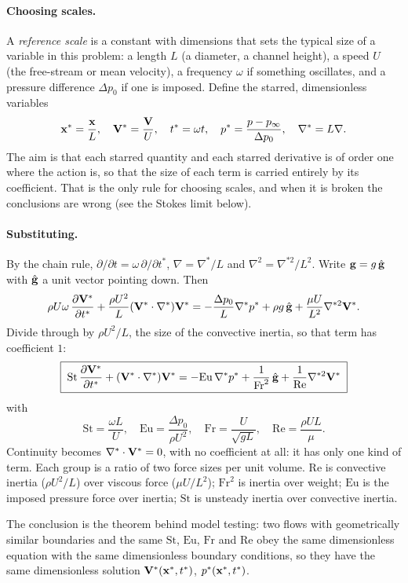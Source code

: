\paragraph{Choosing scales.} A \emph{reference scale} is a constant with dimensions that sets the typical size of a variable in this problem: a length $L$ (a diameter, a channel height), a speed $U$ (the free-stream or mean velocity), a frequency $\omega$ if something oscillates, and a pressure difference $\Delta p_0$ if one is imposed. Define the starred, dimensionless variables
\[
\mathbf{x}^* = \frac{\mathbf{x}}{L}, \quad \mathbf{V}^* = \frac{\mathbf{V}}{U}, \quad t^* = \omega t, \quad p^* = \frac{p - p_\infty}{\Delta p_0}, \quad \nabla^* = L\nabla .
\]
The aim is that each starred quantity and each starred derivative is of order one where the action is, so that the size of each term is carried entirely by its coefficient. That is the only rule for choosing scales, and when it is broken the conclusions are wrong (see the Stokes limit below).

\paragraph{Substituting.} By the chain rule, $\partial/\partial t = \omega\,\partial/\partial t^*$, $\nabla = \nabla^*/L$ and $\nabla^2 = \nabla^{*2}/L^2$. Write $\mathbf{g} = g\,\hat{\mathbf{g}}$ with $\hat{\mathbf{g}}$ a unit vector pointing down. Then
\[
\rho U\omega\,\frac{\partial \mathbf{V}^*}{\partial t^*} + \frac{\rho U^2}{L}(\mathbf{V}^*\cdot\nabla^*)\mathbf{V}^*
= -\frac{\Delta p_0}{L}\nabla^* p^* + \rho g\,\hat{\mathbf{g}} + \frac{\mu U}{L^2}\nabla^{*2}\mathbf{V}^* .
\]
Divide through by $\rho U^2/L$, the size of the convective inertia, so that term has coefficient $1$:
\[
\boxed{\;\mathrm{St}\,\frac{\partial \mathbf{V}^*}{\partial t^*} + (\mathbf{V}^*\cdot\nabla^*)\mathbf{V}^* = -\mathrm{Eu}\,\nabla^*p^* + \frac{1}{\mathrm{Fr}^2}\,\hat{\mathbf{g}} + \frac{1}{\mathrm{Re}}\nabla^{*2}\mathbf{V}^*\;}
\]
with
\[
\mathrm{St} = \frac{\omega L}{U}, \quad \mathrm{Eu} = \frac{\Delta p_0}{\rho U^2}, \quad \mathrm{Fr} = \frac{U}{\sqrt{gL}}, \quad \mathrm{Re} = \frac{\rho U L}{\mu} .
\]
Continuity becomes $\nabla^*\cdot\mathbf{V}^* = 0$, with no coefficient at all: it has only one kind of term. Each group is a ratio of two force sizes per unit volume. $\mathrm{Re}$ is convective inertia ($\rho U^2/L$) over viscous force ($\mu U/L^2$); $\mathrm{Fr}^2$ is inertia over weight; $\mathrm{Eu}$ is the imposed pressure force over inertia; $\mathrm{St}$ is unsteady inertia over convective inertia.

The conclusion is the theorem behind model testing: two flows with geometrically similar boundaries and the same $\mathrm{St}$, $\mathrm{Eu}$, $\mathrm{Fr}$ and $\mathrm{Re}$ obey the same dimensionless equation with the same dimensionless boundary conditions, so they have the same dimensionless solution $\mathbf{V}^*(\mathbf{x}^*, t^*)$, $p^*(\mathbf{x}^*, t^*)$.


